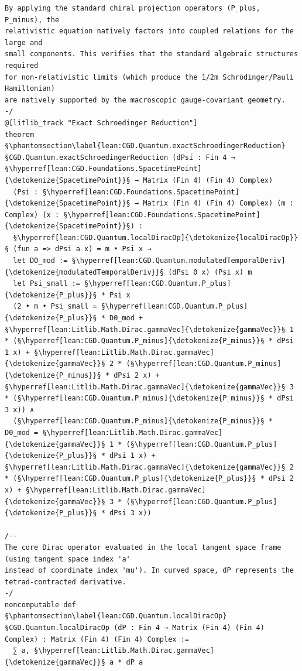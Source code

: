 \begin{verbatim}
By applying the standard chiral projection operators (P_plus, P_minus), the
relativistic equation natively factors into coupled relations for the large and
small components. This verifies that the standard algebraic structures required
for non-relativistic limits (which produce the 1/2m Schrödinger/Pauli Hamiltonian)
are natively supported by the macroscopic gauge-covariant geometry.
-/
@[litlib_track "Exact Schroedinger Reduction"]
theorem §\phantomsection\label{lean:CGD.Quantum.exactSchroedingerReduction}§CGD.Quantum.exactSchroedingerReduction (dPsi : Fin 4 → §\hyperref[lean:CGD.Foundations.SpacetimePoint]{\detokenize{SpacetimePoint}}§ → Matrix (Fin 4) (Fin 4) Complex)
  (Psi : §\hyperref[lean:CGD.Foundations.SpacetimePoint]{\detokenize{SpacetimePoint}}§ → Matrix (Fin 4) (Fin 4) Complex) (m : Complex) (x : §\hyperref[lean:CGD.Foundations.SpacetimePoint]{\detokenize{SpacetimePoint}}§) :
  §\hyperref[lean:CGD.Quantum.localDiracOp]{\detokenize{localDiracOp}}§ (fun a => dPsi a x) = m • Psi x →
  let D0_mod := §\hyperref[lean:CGD.Quantum.modulatedTemporalDeriv]{\detokenize{modulatedTemporalDeriv}}§ (dPsi 0 x) (Psi x) m
  let Psi_small := §\hyperref[lean:CGD.Quantum.P_plus]{\detokenize{P_plus}}§ * Psi x
  (2 • m • Psi_small = §\hyperref[lean:CGD.Quantum.P_plus]{\detokenize{P_plus}}§ * D0_mod + §\hyperref[lean:Litlib.Math.Dirac.gammaVec]{\detokenize{gammaVec}}§ 1 * (§\hyperref[lean:CGD.Quantum.P_minus]{\detokenize{P_minus}}§ * dPsi 1 x) + §\hyperref[lean:Litlib.Math.Dirac.gammaVec]{\detokenize{gammaVec}}§ 2 * (§\hyperref[lean:CGD.Quantum.P_minus]{\detokenize{P_minus}}§ * dPsi 2 x) + §\hyperref[lean:Litlib.Math.Dirac.gammaVec]{\detokenize{gammaVec}}§ 3 * (§\hyperref[lean:CGD.Quantum.P_minus]{\detokenize{P_minus}}§ * dPsi 3 x)) ∧
  (§\hyperref[lean:CGD.Quantum.P_minus]{\detokenize{P_minus}}§ * D0_mod = §\hyperref[lean:Litlib.Math.Dirac.gammaVec]{\detokenize{gammaVec}}§ 1 * (§\hyperref[lean:CGD.Quantum.P_plus]{\detokenize{P_plus}}§ * dPsi 1 x) + §\hyperref[lean:Litlib.Math.Dirac.gammaVec]{\detokenize{gammaVec}}§ 2 * (§\hyperref[lean:CGD.Quantum.P_plus]{\detokenize{P_plus}}§ * dPsi 2 x) + §\hyperref[lean:Litlib.Math.Dirac.gammaVec]{\detokenize{gammaVec}}§ 3 * (§\hyperref[lean:CGD.Quantum.P_plus]{\detokenize{P_plus}}§ * dPsi 3 x))

/--
The core Dirac operator evaluated in the local tangent space frame (using tangent space index 'a'
instead of coordinate index 'mu'). In curved space, dP represents the tetrad-contracted derivative.
-/
noncomputable def §\phantomsection\label{lean:CGD.Quantum.localDiracOp}§CGD.Quantum.localDiracOp (dP : Fin 4 → Matrix (Fin 4) (Fin 4) Complex) : Matrix (Fin 4) (Fin 4) Complex :=
  ∑ a, §\hyperref[lean:Litlib.Math.Dirac.gammaVec]{\detokenize{gammaVec}}§ a * dP a


\end{verbatim}
